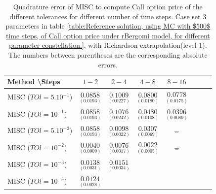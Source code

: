 \documentclass[11pt]{article}
\begin{document}
\begin{table}[h!]
	\centering
	\begin{tabular}{l*{6}{c}r}
		Method \textbackslash  Steps            & $1-2$ & $2-4$ & $4-8$ & $8-16$  \\
		\hline
		MISC ($TOl=5.10^{-1}$)  & $\underset{(  0.0193)}{\mathbf{ 0.0858}}$ & $\underset{(0.0227)}{\mathbf{   0.1009}}$ & $\underset{(0.0180)}{\mathbf{  0.0800}}$ & $\underset{(  0.0175
			)}{\mathbf{ 0.0778
		}}$ \\
		MISC ($TOl=10^{-1}$)  & $\underset{(  0.0193)}{\mathbf{ 0.0858}}$& $\underset{(0.0242
			)}{\mathbf{    0.1076}}$ & $\underset{(0.0108)}{\mathbf{
				0.0480}}$ & $\underset{( 0.0089)}{\mathbf{0.0396}}$  \\
		MISC ($TOl=5.10^{-2}$)  & $\underset{(  0.0193)}{\mathbf{ 0.0858}}$ & $\underset{(
			0.0022)}{\mathbf{ 0.0098}}$ & $\underset{( 0.0069)}{\mathbf{
				0.0307}}$ & $\underset{-}{\mathbf{-}}$  \\
		MISC ($TOl=10^{-2}$)  & $\underset{ (0.0009)}{\mathbf{0.0040}}$ & $\underset{(0.0017)}{\mathbf{0.0076}}$ & $\underset{(0.0005)}{\mathbf{0.0022}}$ & $\underset{-}{\mathbf{-}}$  \\
		MISC ($TOl=10^{-3}$)  & $\underset{ (0.0031)}{\mathbf{0.0138}}$ &      $\underset{ ( 0.0034)}{\mathbf{ 0.0151}}$
		&&\\
		MISC ($TOl=10^{-4}$)  & $\underset{ (0.0028)}{\mathbf{0.0124}}$ &&&\\
		\hline
	\end{tabular}
	\caption{Quadrature error of MISC to compute Call option price of the different tolerances for different number of time steps. Case set $3$ parameters in table \ref{table:Reference solution, using MC with $500$ time steps, of Call option price under rBergomi model, for different parameter constellation.}, with Richardson extrapolation(level $1$). The numbers between parentheses are the corresponding absolute errors.}
	\label{Quadrature error of MISC to compute Call option price of the different tolerances for different number of time steps. Case set $3$ parameters, with Richardson extrapolation(level $1$). The numbers between parentheses are the corresponding absolute errors.}
\end{table}
\end{document}
